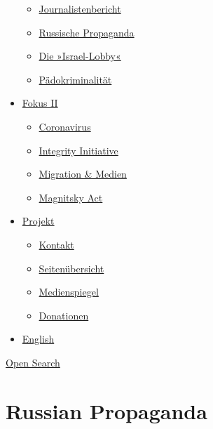\begin{itemize}
  \begin{itemize}
  \tightlist
  \item
    \href{https://swprs.org/bericht-eines-journalisten/}{Journalistenbericht}
  \item
    \href{https://swprs.org/russische-propaganda/}{Russische Propaganda}
  \item
    \href{https://swprs.org/die-israel-lobby-fakten-und-mythen/}{Die
    »Israel-Lobby«}
  \item
    \href{https://swprs.org/geopolitik-und-paedokriminalitaet/}{Pädokriminalität}
  \end{itemize}
\item
  \href{https://swprs.org/migration-und-medien/}{Fokus II}

  \begin{itemize}
  \tightlist
  \item
    \href{https://swprs.org/covid-19-hinweis-ii/}{Coronavirus}
  \item
    \href{https://swprs.org/die-integrity-initiative/}{Integrity
    Initiative}
  \item
    \href{https://swprs.org/migration-und-medien/}{Migration \& Medien}
  \item
    \href{https://swprs.org/der-fall-magnitsky/}{Magnitsky Act}
  \end{itemize}
\item
  \href{https://swprs.org/kontakt/}{Projekt}

  \begin{itemize}
  \tightlist
  \item
    \href{https://swprs.org/kontakt/}{Kontakt}
  \item
    \href{https://swprs.org/uebersicht/}{Seitenübersicht}
  \item
    \href{https://swprs.org/medienspiegel/}{Medienspiegel}
  \item
    \href{https://swprs.org/donationen/}{Donationen}
  \end{itemize}
\item
  \href{https://swprs.org/contact/}{English}
\end{itemize}

\protect\hyperlink{}{Open Search}

\hypertarget{russian-propaganda}{%
\section{Russian Propaganda}\label{russian-propaganda}}

